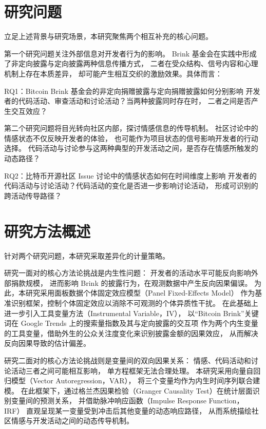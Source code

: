 \documentclass[
    type = master, %
    degree = professional,        %
    decl-page,  %
    twoside,                %
    fontset = fandol %
  ]{njuthesis}
\begin{document}
\section{研究问题}

立足上述背景与研究场景，本研究聚焦两个相互补充的核心问题。

第一个研究问题关注外部信息对开发者行为的影响。
Brink 基金会在实践中形成了非定向披露与定向披露两种信息传播方式，
二者在受众结构、信号内容和心理机制上存在本质差异，
却可能产生相互交织的激励效果。具体而言：

RQ1：Bitcoin Brink 基金会的非定向捐赠披露与定向捐赠披露如何分别影响
开发者的代码活动、审查活动和讨论活动？当两种披露同时存在时，
二者之间是否产生交互效应？

第二个研究问题将目光转向社区内部，探讨情感信息的传导机制。
社区讨论中的情感状态不仅反映开发者的体验，
也可能作为项目状态的信号影响开发者的行动选择。
代码活动与讨论参与这两种典型的开发活动之间，是否存在情感所触发的动态路径？

RQ2：比特币开源社区 Issue 讨论中的情感状态如何在时间维度上影响
开发者的代码活动与讨论活动？代码活动的变化是否进一步影响讨论活动，
形成可识别的跨活动传导路径？

\section{研究方法概述}

针对两个研究问题，本研究采取差异化的计量策略。

研究一面对的核心方法论挑战是内生性问题：
开发者的活动水平可能反向影响外部捐款规模，
进而影响 Brink 的披露行为，在观测数据中产生反向因果偏误。
为此，本研究采用面板数据个体固定效应模型（Panel Fixed-Effects Model）
作为基准识别框架，控制个体固定效应以消除不可观测的个体异质性干扰。
在此基础上进一步引入工具变量方法（Instrumental Variable，IV），
以“Bitcoin Brink”关键词在 Google Trends 上的搜索量指数及其与定向披露的交互项
作为两个内生变量的工具变量，借助外生的公众关注度变化来识别披露金额的因果效应，
从而解决反向因果导致的估计偏差。

研究二面对的核心方法论挑战则是变量间的双向因果关系：
情感、代码活动和讨论活动三者之间可能相互影响，
单方程框架无法合理处理。
本研究采用向量自回归模型（Vector Autoregression，VAR），
将三个变量均作为内生时间序列联合建模。
在此框架下，通过格兰杰因果检验（Granger Causality Test）在统计层面识别变量间的预测关系，
并借助脉冲响应函数（Impulse Response Function，IRF）
直观呈现某一变量受到冲击后其他变量的动态响应路径，
从而系统描绘社区情感与开发活动之间的动态传导机制。
\end{document}
